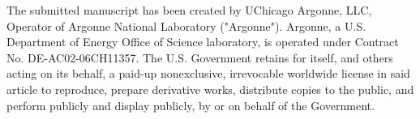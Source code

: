 \documentclass[conference,compsoc]{IEEEtran}
\begin{document}



  


 \vspace{1\baselineskip}
 
 \begin{framed}
 The submitted manuscript has been created by UChicago Argonne, LLC, Operator of Argonne National Laboratory ("Argonne").  Argonne, a U.S. Department of Energy Office of Science laboratory, is operated under Contract No. DE-AC02-06CH11357.  The U.S. Government retains for itself, and others acting on its behalf, a paid-up nonexclusive, irrevocable worldwide license in said article to reproduce, prepare derivative works, distribute copies to the public, and perform publicly and display publicly, by or on behalf of the Government.
 \end{framed}
\end{document}
